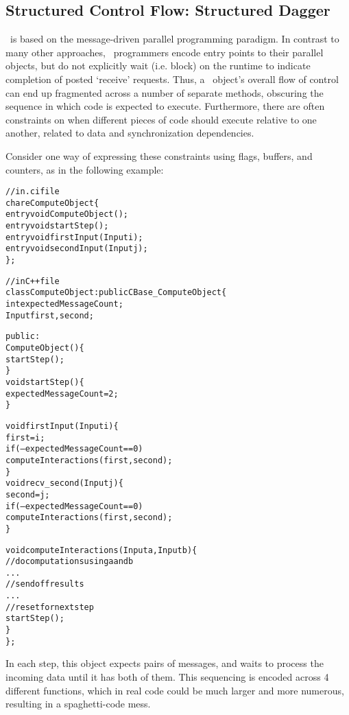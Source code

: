 \subsection{Structured Control Flow: Structured Dagger}
\label{sec:sdag}

\charmpp\ is based on the message-driven parallel programming paradigm. In
contrast to many other approaches, \charmpp\ programmers encode entry points to
their parallel objects, but do not explicitly wait (i.e. block) on the runtime
to indicate completion of posted `receive' requests. Thus, a \charmpp\ object's
overall flow of control can end up fragmented across a number of separate
methods, obscuring the sequence in which code is expected to
execute. Furthermore, there are often constraints on when different pieces of
code should execute relative to one another, related to data and
synchronization dependencies.

Consider one way of expressing these constraints using flags, buffers, and
counters, as in the following example:
%
\begin{center}
\begin{alltt}
// in .ci file
chare ComputeObject \{
  entry void ComputeObject();
  entry void startStep();
  entry void firstInput(Input i);
  entry void secondInput(Input j);
\};

// in C++ file
class ComputeObject : public CBase_ComputeObject \{
  int   expectedMessageCount;
  Input first, second;

public:
  ComputeObject() \{
    startStep();
  \}
  void startStep() \{
    expectedMessageCount = 2;
  \}

  void firstInput(Input i) \{
    first = i;
    if (--expectedMessageCount == 0)
      computeInteractions(first, second);
    \}
  void recv_second(Input j) \{
    second = j;
    if (--expectedMessageCount == 0)
      computeInteractions(first, second);
  \}

  void computeInteractions(Input a, Input b) \{
    // do computations using a and b
    . . .
    // send off results
    . . .
    // reset for next step
    startStep();
  \}
\};
\end{alltt}
\end{center}
In each step, this object expects pairs of messages, and waits to process the
incoming data until it has both of them. This sequencing is encoded across 4
different functions, which in real code could be much larger and more numerous,
resulting in a spaghetti-code mess.


